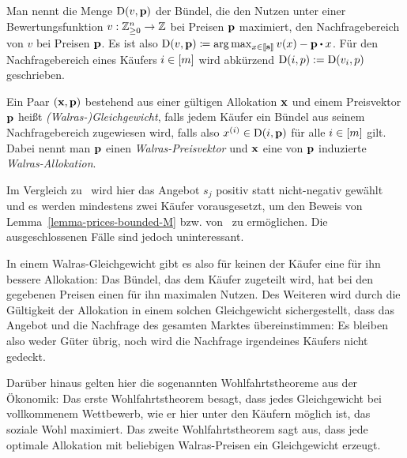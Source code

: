 \begin{definition}[Nachfragebereich]
	Man nennt die Menge $\operatorname{D}(v,\mathbf{p})$ der Bündel, die den Nutzen unter einer Bewertungsfunktion $v:\mathbb{Z}^n_{\geq 0} \rightarrow \mathbb{Z}$ bei Preisen $\mathbf{p}$ maximiert, den Nachfragebereich von $v$ bei Preisen $\mathbf{p}$.
	Es ist also $ \NB(v, \fp) \coloneqq \arg\max_{x\in\ffirst{\fs}} v(x) - \fp \bcdot x$.
	Für den Nachfragebereich eines Käufers $i\in\left[ m \right]$ wird abkürzend $\operatorname{D}(i,p):=\operatorname{D}(v_i, p)$ geschrieben.
\end{definition}

\begin{definition}
	Ein Paar $(\mathbf{x}, \mathbf{p})$ bestehend aus einer gültigen Allokation $\mathbf{x}$ und einem Preisvektor $\mathbf{p}$ heißt \emph{(Walras-)Gleichgewicht}, falls jedem Käufer ein Bündel aus seinem Nachfragebereich zugewiesen wird, falls also $x^{(i)} \in \operatorname{D}(i, \mathbf{p})$ für alle $i\in \left[ m \right]$ gilt.
	Dabei nennt man $\mathbf{p}$ einen \emph{Walras-Preisvektor} und $\mathbf{x}$ eine von $\mathbf{p}$ induzierte \emph{Walras-Allokation}.
\end{definition}

\begin{bemerkung}
	Im Vergleich zu~\cite{PaesLeme2018} wird hier das Angebot $s_j$ positiv statt nicht-negativ gewählt und es werden mindestens zwei Käufer vorausgesetzt, um den Beweis von Lemma~\ref{lemma-prices-bounded-M} bzw. von~\cite[Lemma 4]{PaesLeme2018} zu ermöglichen.
	Die ausgeschlossenen Fälle sind jedoch uninteressant.
\end{bemerkung}

In einem Walras-Gleichgewicht gibt es also für keinen der Käufer eine für ihn bessere Allokation: Das Bündel, das dem Käufer zugeteilt wird, hat bei den gegebenen Preisen einen für ihn maximalen Nutzen.
Des Weiteren wird durch die Gültigkeit der Allokation in einem solchen Gleichgewicht sichergestellt, dass das Angebot und die Nachfrage des gesamten Marktes übereinstimmen: Es bleiben also weder Güter übrig, noch wird die Nachfrage irgendeines Käufers nicht gedeckt.

Darüber hinaus gelten hier die sogenannten Wohlfahrtstheoreme aus der Ökonomik:
Das erste Wohlfahrtstheorem besagt, dass jedes Gleichgewicht bei vollkommenem Wettbewerb, wie er hier unter den Käufern möglich ist, das soziale Wohl maximiert.
Das zweite Wohlfahrtstheorem sagt aus, dass jede optimale Allokation mit beliebigen Walras-Preisen ein Gleichgewicht erzeugt.

